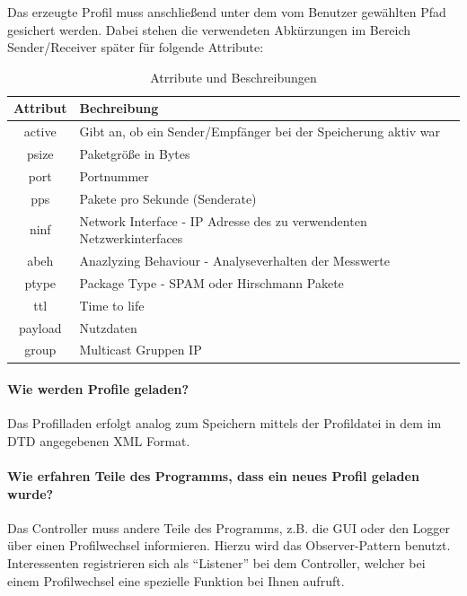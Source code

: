   
  Das erzeugte Profil muss anschließend unter dem vom Benutzer gewählten Pfad gesichert werden.
  Dabei stehen die verwendeten Abkürzungen im Bereich Sender/Receiver später für folgende Attribute:

  \begin{table}[H]
    \label{tap:types}
    \caption{Atrribute und Beschreibungen}
    \center
    \begin{tabular}{|c|p{8cm}|}
    \hline
    \textbf{Attribut} & \textbf{Bechreibung}\\
    \hline
    active & Gibt an, ob ein Sender/Empfänger bei der Speicherung aktiv war\\
    \hline
    psize & Paketgröße in Bytes\\
    \hline
    port & Portnummer\\
    \hline
    pps & Pakete pro Sekunde (Senderate)\\
    \hline
    ninf & Network Interface - IP Adresse des zu verwendenten Netzwerkinterfaces\\
    \hline
   	abeh & Anazlyzing Behaviour - Analyseverhalten der Messwerte\\
    \hline
   	ptype & Package Type - SPAM oder Hirschmann Pakete\\
    \hline
    ttl & Time to life\\
    \hline
    payload & Nutzdaten\\
    \hline
    group &  Multicast Gruppen IP\\
    \hline
    \end{tabular}
  \end{table}

  \paragraph{Wie werden Profile geladen?}
  Das Profilladen erfolgt analog zum Speichern mittels der Profildatei in dem im DTD angegebenen XML Format.
  \paragraph{Wie erfahren Teile des Programms, dass ein neues Profil geladen wurde?}
  Das Controller muss andere Teile des Programms, z.B. die GUI oder den Logger über einen Profilwechsel informieren. Hierzu wird das Observer-Pattern benutzt.
  Interessenten registrieren sich als "`Listener"' bei dem Controller, welcher bei einem Profilwechsel eine spezielle Funktion bei Ihnen aufruft.
